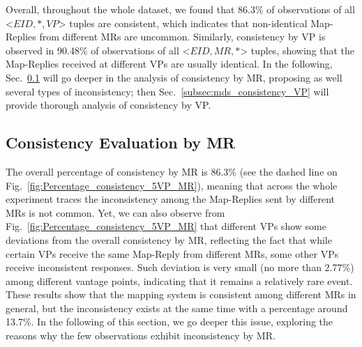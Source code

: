 Overall, throughout the whole dataset, we found that 86.3\% of observations of all <$EID, *, VP$> tuples are consistent, which indicates that non-identical Map-Replies from different MRs are uncommon. Similarly, consistency by VP is observed in 90.48\% of observations of all <$EID, MR, * $> tuples, showing that the Map-Replies received at different VPs are usually identical. In the following, Sec.~\ref{subsec:mds_consistency_MR} will go deeper in the analysis of consistency by MR, proposing as well several types of inconsistency; then Sec.~\ref{subsec:mds_consistency_VP} will provide thorough analysis of consistency by VP.


\subsection{Consistency Evaluation by MR}
\label{subsec:mds_consistency_MR}

The overall percentage of consistency by MR is 86.3\% (see the dashed line on Fig.~\ref{fig:Percentage_consistency_5VP_MR}), meaning that across the whole experiment traces the inconsistency among the Map-Replies sent by different MRs is not common. Yet, we can also observe from Fig.~\ref{fig:Percentage_consistency_5VP_MR} that different VPs show some deviations from the overall consistency by MR, reflecting the fact that while certain VPs receive the same Map-Reply from different MRs, some other VPs receive inconsistent responses. Such deviation is very small (no more than 2.77\%) among different vantage points, indicating that it remains a relatively rare event. These results show that the mapping system is consistent among different MRs in general, but the inconsistency exists at the same time with a percentage around 13.7\%.  In the following of this section, we go deeper this issue, exploring the reasons why the few observations exhibit
inconsistency by MR.

